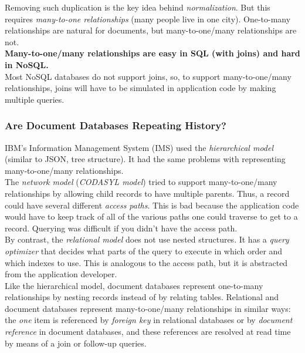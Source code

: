 \documentclass[12pt, titlepage]{article}
\begin{document}
Removing such duplication is the key idea behind \textit{normalization}. But this requires \textit{many-to-one relationships} (many people live in one city). One-to-many relationships are natural for documents, but many-to-one/many relationships are not. \\

\textbf{Many-to-one/many relationships are easy in SQL (with joins) and hard in NoSQL.} \\

Most NoSQL databases do not support joins, so, to support many-to-one/many relationships, joins will have to be simulated in application code by making multiple queries.

\subsubsection{Are Document Databases Repeating History?}

IBM's Information Management System (IMS) used the \textit{hierarchical model} (similar to JSON, tree structure). It had the same problems with representing many-to-one/many relationships. \\

The \textit{network model} (\textit{CODASYL model}) tried to support many-to-one/many relationships by allowing child records to have multiple parents. Thus, a record could have several different \textit{access paths}. This is bad because the application code would have to keep track of all of the various paths one could traverse to get to a record. Querying was difficult if you didn't have the access path. \\

By contrast, the \textit{relational model} does not use nested structures. It has a \textit{query optimizer} that decides what parts of the query to execute in which order and which indexes to use. This is analogous to the access path, but it is abstracted from the application developer. \\

Like the hierarchical model, document databases represent one-to-many relationships by nesting records instead of by relating tables. Relational and document databases represent many-to-one/many relationships in similar ways: the \textit{one} item is referenced by \textit{foreign key} in relational databases or by \textit{document reference} in document databases, and these references are resolved at read time by means of a join or follow-up queries.
\end{document}
